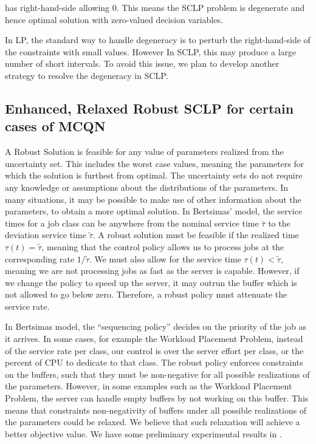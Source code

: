 \documentclass[11pt,a4paper,titlepage]{article}
\theoremstyle{definition}
\theoremstyle{plain}
\begin{document}
 has right-hand-side allowing $0$.
This means the SCLP problem is degenerate and hence optimal solution with zero-valued
decision variables.

In LP,
the standard way to handle degeneracy is to perturb the right-hand-side
of the constraints with small values.
However In SCLP, this may produce a large number of short intervals.
To avoid this issue,
we plan to develop another strategy to resolve the degeneracy in SCLP.

\subsection{Enhanced, Relaxed Robust SCLP for certain cases of MCQN}
\label{subsec:topics:enhanced-robust-sclp}

A Robust Solution is feasible for any value of parameters realized from the
uncertainty set.
This includes the worst case values,
meaning the parameters for which the solution is furthest from optimal.
The uncertainty sets do not require any knowledge or assumptions about the distributions of the parameters.
In many situations,
it may be possible to make use of other information about the parameters,
to obtain a more optimal solution.
In Bertsimas' model,
the service times for a job class can be anywhere from the nominal service time $\bar{\tau}$
to the deviation service time $\tilde{\tau}$.
A robust solution must be feasible if the realized time $\tau(t)=\tilde{\tau}$,
meaning that the control policy allows us to process jobs at the corresponding rate $1/\tilde{\tau}$.
We must also allow for the service time $\tau(t) < \tilde{\tau}$,
meaning we are not processing jobs as fast as the server is capable.
However,
if we change the policy to speed up the server,
it may outrun the buffer which is not allowed to go below zero.
Therefore,
a robust policy must attenuate the service rate.

In Bertsimas model,
the ``sequencing policy'' decides on the priority of the job as it arrives.
In some cases,
for example the Workload Placement Problem,
instead of the service rate per class,
our control is over the server effort per class,
or the percent of CPU to dedicate to that class.
The robust policy enforces constraints on the buffers,
such that they must be non-negative for all possible realizations of the parameters.
However,
in some examples such as the Workload Placement Problem,
the server can handle empty buffers by not working on this buffer.
This means that constraints non-negativity of buffers under all possible realizations of the parameters could be relaxed.
We believe that such relaxation will achieve a better objective value.
We have some preliminary experimental results in .
\end{document}
